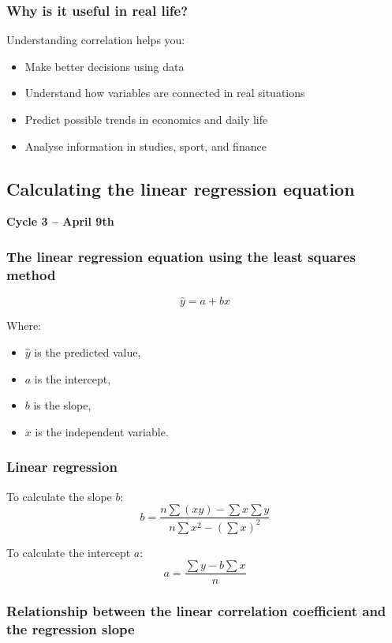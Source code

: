 \documentclass[12pt]{article}
\begin{document}
	\subsubsection*{Why is it useful in real life?}
	
	Understanding correlation helps you:
	\begin{itemize}
		\item Make better decisions using data
		\item Understand how variables are connected in real situations
		\item Predict possible trends in economics and daily life
		\item Analyse information in studies, sport, and finance
	\end{itemize}
	
	\subsection{Calculating the linear regression equation}
	\textbf{Cycle 3 -- April 9th}
	
	\subsubsection*{The linear regression equation using the least squares method}
	
	\[
	\hat{y}=a+bx
	\]
	
	Where:
	\begin{itemize}
		\item $\hat{y}$ is the predicted value,
		\item $a$ is the intercept,
		\item $b$ is the slope,
		\item $x$ is the independent variable.
	\end{itemize}
	
	\subsubsection*{Linear regression}
	
	To calculate the slope $b$:
	\[
	b=\frac{n\sum(xy)-\sum x \sum y}{n\sum x^2-(\sum x)^2}
	\]
	
	To calculate the intercept $a$:
	\[
	a=\frac{\sum y-b\sum x}{n}
	\]
	
	\subsubsection*{Relationship between the linear correlation coefficient and the regression slope}
	
\end{document}
